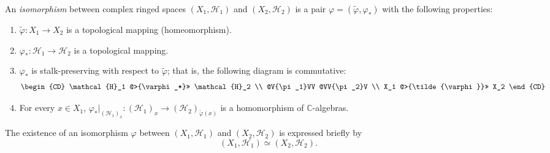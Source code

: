 An \textit{isomorphism} between complex ringed spaces $(X_1, \mathcal{H}_1)$ and $(X_2, \mathcal{H}_2)$ is a pair $\varphi = (\tilde{\varphi}, \varphi_*)$ with the following properties:
\begin{enumerate}
\item $\tilde{\varphi}: X_1 \rightarrow X_2$ is a topological mapping (homeomorphism).
\item $\varphi_*: \mathcal{H}_1 \rightarrow \mathcal{H}_2$ is a topological mapping.
\item $\varphi_*$ is stalk-preserving with respect to $\tilde{\varphi}$; that is, the following diagram is commutative:
\[
\begin{CD}
\mathcal{H}_1 @>{\varphi_*}>> \mathcal{H}_2 \\
@V{\pi_1}VV @VV{\pi_2}V \\
X_1 @>{\tilde{\varphi}}>> X_2
\end{CD}
\]
\item For every $x \in X_1$, $\varphi_*|_{(\mathcal{H}_1)_x}: (\mathcal{H}_1)_x \rightarrow (\mathcal{H}_2)_{\tilde{\varphi}(x)}$ is a homomorphism of $\mathbb{C}$-algebras.
\end{enumerate}
The existence of an isomorphism $\varphi$ between $(X_1, \mathcal{H}_1)$ and $(X_2, \mathcal{H}_2)$ is expressed briefly by
$$(X_1, \mathcal{H}_1) \simeq (X_2, \mathcal{H}_2).$$
